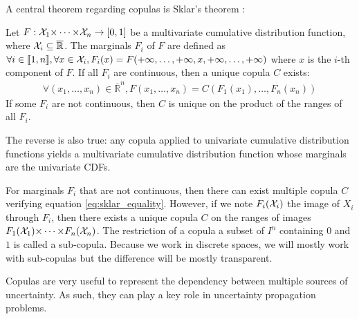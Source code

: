 A central theorem regarding copulas is Sklar's theorem \cite{sklar_fonctions_1959}:
\begin{theorem}\label{theorem:sklar}
    Let $F:{\mathcal{X}}_1{\times\dots\times}{\mathcal{X}}_n\rightarrow[0,1]$ be a multivariate cumulative distribution function, where ${\mathcal{X}}_i\subseteq\overline{\mathbb{R}}$. The marginals $F_i$ of $F$ are defined as $\forall i\in{[\![} 1,n{]\!]} , \forall x\in{\mathcal{X}}_i, F_i(x) = F( +\infty, \dots,  +\infty, x,  +\infty, \dots, +\infty)$ where $x$ is the $i$-th component of $F$. If all $F_i$ are continuous, then a unique copula $C$ exists:
    \begin{eqnarray}
        \forall (x_1,\dots,x_n)\in \overline{\mathbb{R}}^n, F(x_1,\dots,x_n)=C(F_1(x_1),\dots, F_n(x_n))\label{eq:sklar_equality}
    \end{eqnarray}
    If some $F_i$ are not continuous, then $C$ is unique on the product of the ranges of all $F_i$.
    
    The reverse is also true: any copula applied to univariate cumulative distribution functions yields a multivariate cumulative distribution function whose marginals are the univariate CDFs.
\end{theorem}

\begin{remark}
    For marginals $F_i$ that are not continuous, then there can exist multiple copula $C$ verifying equation \ref{eq:sklar_equality}. However, if we note $F_i({\mathcal{X}}_i)$ the image of $X_i$ through $F_i$, then there exists a unique copula $C$ on the ranges of images $F_1({\mathcal{X}}_1){\times\dots\times} F_n({\mathcal{X}}_n)$. The restriction of a copula a subset of $I^n$ containing $0$ and $1$ is called a sub-copula. Because we work in discrete spaces, we will mostly work with sub-copulas but the difference will be mostly transparent.
\end{remark}

Copulas are very useful to represent the dependency between multiple sources of uncertainty. As such, they can play a key role in uncertainty propagation problems. 

